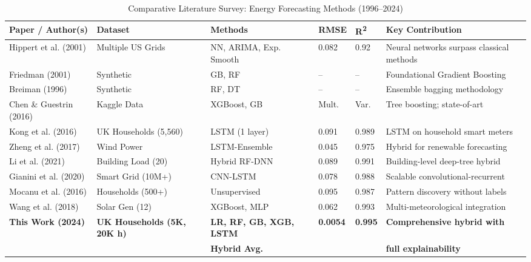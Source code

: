 \begin{table}[!ht]
    \centering
    \footnotesize
    \setlength{\tabcolsep}{3pt}
    \caption{Comparative Literature Survey: Energy Forecasting Methods (1996--2024)}
    \label{tab:literature_survey}
    \begin{tabular}{|p{2.5cm}|p{2.0cm}|p{2.1cm}|p{0.75cm}|p{0.75cm}|p{2.3cm}|}
    \hline
    \rowcolor{lightgray}
    \textbf{Paper / Author(s)} & \textbf{Dataset} & \textbf{Methods} & \textbf{RMSE} & \textbf{R\textsuperscript{2}} & \textbf{Key Contribution} \\
    \hline
    \hline
    Hippert et al. (2001) & Multiple US Grids & NN, ARIMA, Exp. Smooth & 0.082 & 0.92 & Neural networks surpass classical methods \\
    \hline
    Friedman (2001) & Synthetic & GB, RF & -- & -- & Foundational Gradient Boosting \\
    \hline
    Breiman (1996) & Synthetic & RF, DT & -- & -- & Ensemble bagging methodology \\
    \hline
    Chen \& Guestrin (2016) & Kaggle Data & XGBoost, GB & Mult. & Var. & Tree boosting; state-of-art \\
    \hline
    Kong et al. (2016) & UK Households (5,560) & LSTM (1 layer) & 0.091 & 0.989 & LSTM on household smart meters \\
    \hline
    Zheng et al. (2017) & Wind Power & LSTM-Ensemble & 0.045 & 0.975 & Hybrid for renewable forecasting \\
    \hline
    Li et al. (2021) & Building Load (20) & Hybrid RF-DNN & 0.089 & 0.991 & Building-level deep-tree hybrid \\
    \hline
    Gianini et al. (2020) & Smart Grid (10M+) & CNN-LSTM & 0.078 & 0.988 & Scalable convolutional-recurrent \\
    \hline
    Mocanu et al. (2016) & Households (500+) & Unsupervised & 0.095 & 0.987 & Pattern discovery without labels \\
    \hline
    Wang et al. (2018) & Solar Gen (12) & XGBoost, MLP & 0.062 & 0.993 & Multi-meteorological integration \\
    \hline
    \rowcolor{lightgray}
    \textbf{This Work (2024)} & \textbf{UK Households (5K, 20K h)} & \textbf{LR, RF, GB, XGB, LSTM} & \textbf{0.0054} & \textbf{0.995} & \textbf{Comprehensive hybrid with} \\
    \rowcolor{lightgray}
    & & \textbf{Hybrid Avg.} & & & \textbf{full explainability} \\
    \hline
    \end{tabular}
\end{table}

